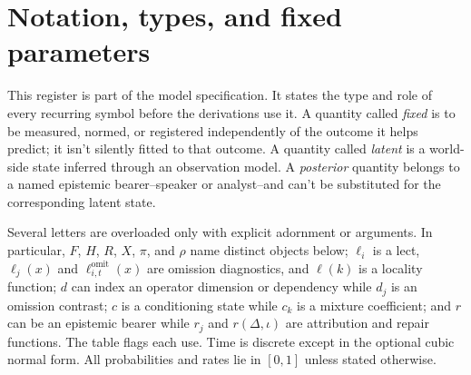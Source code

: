 \section*{Notation, types, and fixed parameters}
\label{sec:notation-register}

This register is part of the model specification. It states the type and role
of every recurring symbol before the derivations use it. A quantity called
\emph{fixed} is to be measured, normed, or registered independently of the
outcome it helps predict; it isn't silently fitted to that outcome. A quantity
called \emph{latent} is a world-side state inferred through an observation
model. A \emph{posterior} quantity belongs to a named epistemic bearer--speaker
or analyst--and can't be substituted for the corresponding latent state.

Several letters are overloaded only with explicit adornment or arguments. In
particular, $F$, $H$, $R$, $X$, $\pi$, and $\rho$ name distinct objects below;
$\ell_i$ is a lect, $\ell_j(x)$ and $\ell^{\mathrm{omit}}_{i,t}(x)$ are
omission diagnostics, and $\ell(k)$ is a locality function; $d$ can index an
operator dimension or dependency while
$d_j$ is an omission contrast; $c$ is a conditioning state while $c_k$ is a
mixture coefficient; and $r$ can be an epistemic bearer while $r_j$ and
$r(\Delta,\iota)$ are attribution and repair functions. The table flags each
use. Time is discrete except in the optional cubic normal form. All
probabilities and rates lie in $[0,1]$ unless stated otherwise.

